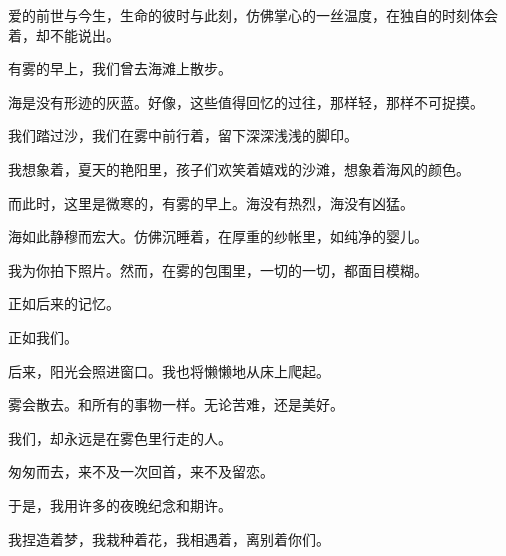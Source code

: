 		爱的前世与今生，生命的彼时与此刻，仿佛掌心的一丝温度，在独自的时刻体会着，却不能说出。

		有雾的早上，我们曾去海滩上散步。\par
		海是没有形迹的灰蓝。好像，这些值得回忆的过往，那样轻，那样不可捉摸。\par
		我们踏过沙，我们在雾中前行着，留下深深浅浅的脚印。\par
		我想象着，夏天的艳阳里，孩子们欢笑着嬉戏的沙滩，想象着海风的颜色。\par
		而此时，这里是微寒的，有雾的早上。海没有热烈，海没有凶猛。\par
		海如此静穆而宏大。仿佛沉睡着，在厚重的纱帐里，如纯净的婴儿。\par
		我为你拍下照片。然而，在雾的包围里，一切的一切，都面目模糊。\par
		正如后来的记忆。\par
		正如我们。

		后来，阳光会照进窗口。我也将懒懒地从床上爬起。\par
		雾会散去。和所有的事物一样。无论苦难，还是美好。\par
		我们，却永远是在雾色里行走的人。\par
		匆匆而去，来不及一次回首，来不及留恋。\par
		于是，我用许多的夜晚纪念和期许。\par
		我捏造着梦，我栽种着花，我相遇着，离别着你们。

	\endwriting



